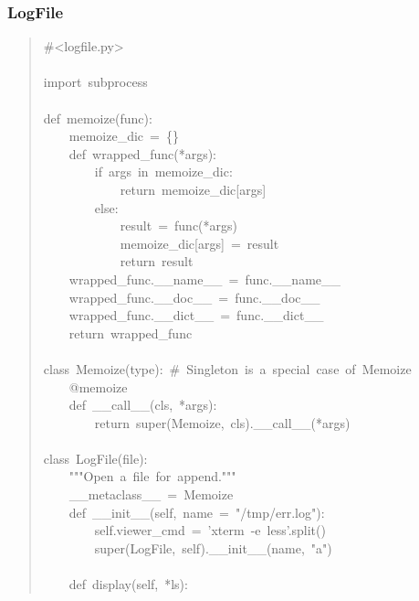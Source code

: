 \documentclass[10pt,a4paper,english]{article}
\begin{document}
\subsubsection*{LogFile}
\begin{quote}{\ttfamily \raggedright \noindent
{\#}<logfile.py>~\\
~\\
import~subprocess~\\
~\\
def~memoize(func):~\\
~~~~memoize{\_}dic~=~{\{}{\}}~\\
~~~~def~wrapped{\_}func(*args):~\\
~~~~~~~~if~args~in~memoize{\_}dic:~\\
~~~~~~~~~~~~return~memoize{\_}dic{[}args]~\\
~~~~~~~~else:~\\
~~~~~~~~~~~~result~=~func(*args)~\\
~~~~~~~~~~~~memoize{\_}dic{[}args]~=~result~\\
~~~~~~~~~~~~return~result~\\
~~~~wrapped{\_}func.{\_}{\_}name{\_}{\_}~=~func.{\_}{\_}name{\_}{\_}~\\
~~~~wrapped{\_}func.{\_}{\_}doc{\_}{\_}~=~func.{\_}{\_}doc{\_}{\_}~\\
~~~~wrapped{\_}func.{\_}{\_}dict{\_}{\_}~=~func.{\_}{\_}dict{\_}{\_}~\\
~~~~return~wrapped{\_}func~\\
~\\
class~Memoize(type):~{\#}~Singleton~is~a~special~case~of~Memoize~\\
~~~~@memoize~\\
~~~~def~{\_}{\_}call{\_}{\_}(cls,~*args):~\\
~~~~~~~~return~super(Memoize,~cls).{\_}{\_}call{\_}{\_}(*args)~\\
~\\
class~LogFile(file):~\\
~~~~"{}"{}"Open~a~file~for~append."{}"{}"~\\
~~~~{\_}{\_}metaclass{\_}{\_}~=~Memoize~\\
~~~~def~{\_}{\_}init{\_}{\_}(self,~name~=~"/tmp/err.log"):~\\
~~~~~~~~self.viewer{\_}cmd~=~'xterm~-e~less'.split()~\\
~~~~~~~~super(LogFile,~self).{\_}{\_}init{\_}{\_}(name,~"a")~\\
~\\
~~~~def~display(self,~*ls):~\\
}
\end{quote}
\end{document}
